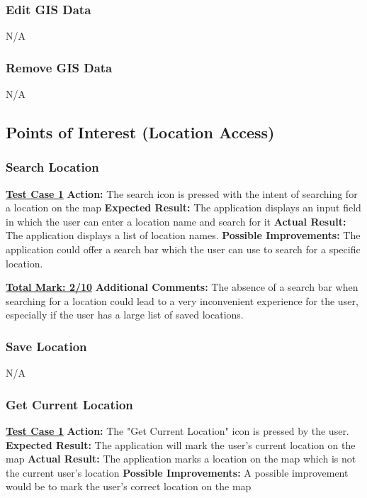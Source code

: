 \documentclass[english]{article}
\begin{document}
\subsubsection{Edit GIS Data}
N/A

\subsubsection{Remove GIS Data}
N/A

\subsection{Points of Interest (Location Access)}

\subsubsection{Search Location}
\textbf{\underline{Test Case 1}}\newline
\textbf{Action:} The search icon is pressed with the intent of searching for a location on the map\newline
\textbf{Expected Result:} The application displays an input field in which the user can enter a location name and search for it\newline
\textbf{Actual Result:} The application displays a list of location names.\newline
\textbf{Possible Improvements:} The application could offer a search bar which the user can use to search for a specific location.\newline

\textbf{\underline{Total Mark: 2/10}}\newline
\textbf{Additional Comments:} The absence of a search bar when searching for a location could lead to a very inconvenient experience for the user, especially if the user has a large list of saved locations.\newline

\subsubsection{Save Location}
N/A

\subsubsection{Get Current Location}
\textbf{\underline{Test Case 1}}\newline
\textbf{Action:} The "Get Current Location" icon is pressed by the user.\newline
\textbf{Expected Result:} The application will mark the user's current location on the map\newline
\textbf{Actual Result:} The application marks a location on the map which is not the current user's location\newline
\textbf{Possible Improvements:} A possible improvement would be to mark the user's correct location on the map\newline
\end{document}
